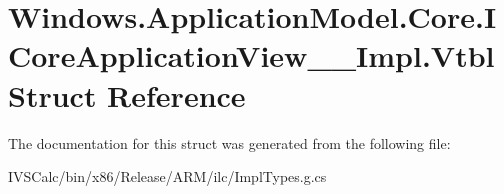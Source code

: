 \hypertarget{struct_windows_1_1_application_model_1_1_core_1_1_i_core_application_view_____impl_1_1_vtbl}{}\section{Windows.\+Application\+Model.\+Core.\+I\+Core\+Application\+View\+\_\+\+\_\+\+Impl.\+Vtbl Struct Reference}
\label{struct_windows_1_1_application_model_1_1_core_1_1_i_core_application_view_____impl_1_1_vtbl}


The documentation for this struct was generated from the following file\+:\begin{DoxyCompactItemize}
\item 
I\+V\+S\+Calc/bin/x86/\+Release/\+A\+R\+M/ilc/Impl\+Types.\+g.\+cs\end{DoxyCompactItemize}
